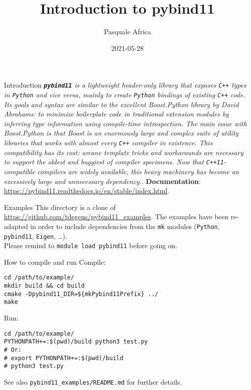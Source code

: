 \documentclass[aspectratio=169,11pt]{beamer}
\title{Introduction to pybind11}
\author{Pasquale Africa}
\institute{Politecnico di Milano}
\date{2021-05-28}
\begin{document}
\begin{frame}[plain]{}
    \maketitle
\end{frame}

\begin{frame}{Introduction}
    \textit{\textbf{\texttt{pybind11}} is a lightweight header-only library that exposes \texttt{C++} types in \texttt{Python} and vice versa, mainly to create \texttt{Python} bindings of existing \texttt{C++} code.}
    \vfill
    \textit{Its goals and syntax are similar to the excellent Boost.Python library by David Abrahams: to minimize boilerplate code in traditional extension modules by inferring type information using compile-time introspection.}
    \vfill
    \textit{The main issue with Boost.Python is that Boost is an enormously large and complex suite of utility libraries that works with almost every \texttt{C++} compiler in existence. This compatibility has its cost: arcane template tricks and workarounds are necessary to support the oldest and buggiest of compiler specimens. Now that \texttt{C++11}-compatible compilers are widely available, this heavy machinery has become an excessively large and unnecessary dependency.}.
    \vfill
    \textbf{Documentation}: \url{https://pybind11.readthedocs.io/en/stable/index.html}.
\end{frame}

\begin{frame}{Examples}
    This directory is a clone of \url{https://github.com/tdegeus/pybind11_examples}.
    \vfill
    The examples have been re-adapted in order to include dependencies from the \texttt{mk} modules (\texttt{Python}, \texttt{pybind11}, \texttt{Eigen}, \dots).\\
    Please remind to \texttt{module load pybind11} before going on.
\end{frame}

\begin{frame}[fragile]{How to compile and run}
    Compile:
    \begin{verbatim}
cd /path/to/example/
mkdir build && cd build
cmake -Dpybind11_DIR=${mkPybind11Prefix} ../
make
    \end{verbatim}
    Run:
    \begin{verbatim}
cd /path/to/example/
PYTHONPATH+=:$(pwd)/build python3 test.py
# Or:
# export PYTHONPATH+=:$(pwd)/build
# python3 test.py
    \end{verbatim}
    
    See also \texttt{pybind11\_examples/README.md} for further details.
\end{frame}
\end{document}
